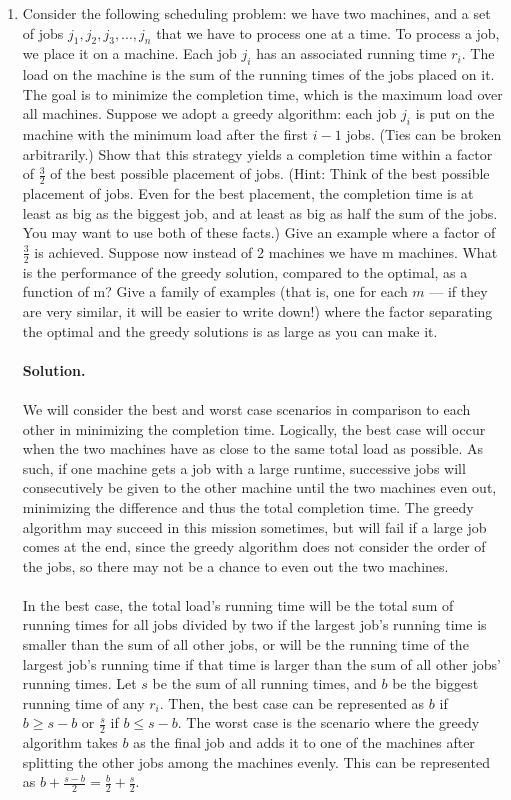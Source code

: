\documentclass[11pt]{article}
\newcommand\solution{%
  \textbf{Solution.}\\%
}
\begin{document}
\begin{enumerate}
\item 
Consider the following scheduling problem: we have two machines, and a set of jobs $j_1 , j_2 , j_3 , . . . , j_n$ that we have to process one at a time. To process a job, we place it on a machine. Each job $j_i$ has an associated running time $r_i$. The load on the machine is the sum of the running times of the jobs placed on it. The goal is to minimize the completion time, which is the maximum load over all machines.
\medskip
Suppose we adopt a greedy algorithm: each job $j_i$ is put on the machine with the minimum load after the first $i - 1$ jobs. (Ties can be broken arbitrarily.) Show that this strategy yields a completion time within a factor of $\frac{3}{2}$ of the best possible placement of jobs. (Hint: Think of the best possible placement of jobs. Even for the best placement, the completion time is at least as big as the biggest job, and at least as big as half the sum of the jobs. You may want to use both of these facts.) Give an example where a factor of $\frac{3}{2}$ is achieved.
\medskip
Suppose now instead of 2 machines we have m machines. What is the performance of the greedy solution, compared to the optimal, as a function of m? Give a family of examples (that is, one for each $m$ --- if they are very similar, it will be easier to write down!) where the factor separating the optimal and the greedy solutions is as large as you can make it. \\\\
\solution \\
We will consider the best and worst case scenarios in comparison to each other in minimizing the completion time. Logically, the best case will occur when the two machines have as close to the same total load as possible. As such, if one machine gets a job with a large runtime, successive jobs will consecutively be given to the other machine until the two machines even out, minimizing the difference and thus the total completion time. The greedy algorithm may succeed in this mission sometimes, but will fail if a large job comes at the end, since the greedy algorithm does not consider the order of the jobs, so there may not be a chance to even out the two machines. \\
\\
In the best case, the total load's running time will be the total sum of running times for all jobs divided by two if the largest job's running time is smaller than the sum of all other jobs, or will be the running time of the largest job's running time if that time is larger than the sum of all other jobs' running times. Let $s$ be the sum of all running times, and $b$ be the biggest running time of any $r_i$. Then, the best case can be represented as $b$ if $b \geq s - b$ or $\frac{s}{2}$ if $b \leq s - b$. The worst case is the scenario where the greedy algorithm takes $b$ as the final job and adds it to one of the machines after splitting the other jobs among the machines evenly. This can be represented as $b + \frac{s-b}{2} = \frac{b}{2} + \frac{s}{2}$. \\

\end{enumerate}
\end{document}
